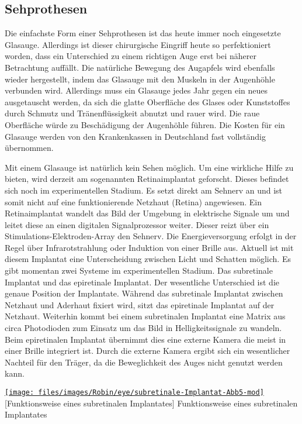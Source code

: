 \subsection{Sehprothesen}
\label{sec:Robin:topical:visual_prosthesis}
Die einfachste Form einer Sehprothesen ist das heute immer noch eingesetzte Glasauge. Allerdings
ist dieser chirurgische Eingriff heute so perfektioniert worden, dass ein Unterschied zu einem
richtigen Auge erst bei näherer Betrachtung auffällt. Die natürliche Bewegung des Augapfels wird
ebenfalls wieder hergestellt, indem das Glasauge mit den Muskeln in der Augenhöhle verbunden wird.
Allerdings muss ein Glasauge jedes Jahr gegen ein neues ausgetauscht werden, da sich die glatte
Oberfläche des Glases oder Kunststoffes durch Schmutz und Tränenflüssigkeit abnutzt und rauer
wird. Die raue Oberfläche würde zu Beschädigung der Augenhöhle führen.
Die Kosten für ein Glasauge werden von den Krankenkassen in Deutschland fast vollständig übernommen.

Mit einem Glasauge ist natürlich kein Sehen möglich. Um eine wirkliche Hilfe zu bieten, wird derzeit
am sogenannten Retinaimplantat geforscht. Dieses befindet sich noch im experimentellen Stadium.
Es setzt direkt am
Sehnerv an und ist somit nicht auf eine funktionierende Netzhaut (Retina) angewiesen. Ein
Retinaimplantat wandelt das Bild der Umgebung in elektrische Signale um und leitet diese an einen
digitalen
Signalprozessor weiter. Dieser reizt über ein Stimulations-Elektroden-Array den Sehnerv. Die
Energieversorgung erfolgt in der Regel über Infrarotstrahlung oder Induktion von einer Brille aus.
Aktuell ist mit diesem Implantat eine Unterscheidung zwischen Licht und Schatten möglich. Es gibt
momentan zwei Systeme im experimentellen Stadium. Das subretinale Implantat und das epiretinale
Implantat. Der wesentliche Unterschied ist die genaue Position der Implantate. Während das
subretinale Implantat zwischen Netzhaut und Aderhaut fixiert wird, sitzt das epiretinale Implantat
auf der Netzhaut. Weiterhin kommt bei einem subretinalen Implantat eine Matrix aus circa
 Photodioden zum Einsatz um das Bild in Helligkeitssignale zu wandeln. Beim
epiretinalen
Implantat übernimmt dies eine externe Kamera die meist in einer Brille integriert ist. Durch die
externe Kamera ergibt sich ein wesentlicher Nachteil für den Träger, da die Beweglichkeit des Auges
nicht genutzt werden kann.

\begin{figurewrapper}
	\href{http://www.oe.uni-duisburg-essen.de/latestnews/augenblicke/Abb5.jpg}{%
		\texttt{[image: files/images/Robin/eye/subretinale-Implantat-Abb5-mod]}%
	}
	[Funktionsweise eines subretinalen Implantates]%
		{Funktionsweise eines subretinalen Implantates\footnotemark}
	\label{fig:Subretinal_Implant}
\end{figurewrapper}

